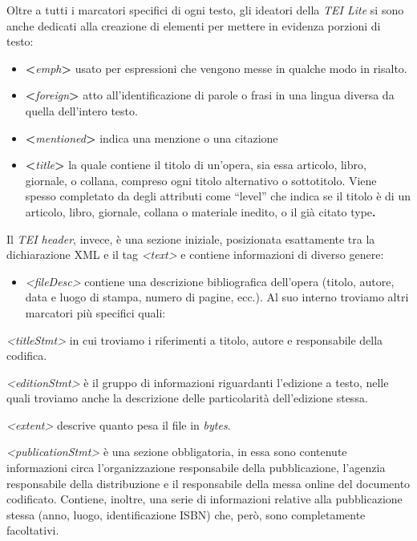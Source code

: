 \documentclass[
  b5paper,
  twoside,
  11pt,
  chapterprefix=false,
  bibliography=totocnumbered,
  parskip=0]{scrbook}
\providecommand{\tightlist}{%
  \setlength{\itemsep}{0pt}\setlength{\parskip}{0pt}}
\begin{document}
Oltre a tutti i marcatori specifici di ogni testo, gli ideatori della
\emph{TEI Lite} si sono anche dedicati alla creazione di elementi per mettere
in evidenza porzioni di testo:

\begin{itemize}
\item
  \textbf{\textless{}}\emph{emph}\textbf{\textgreater{}} usato per espressioni che vengono messe in
  qualche modo in risalto.
\item
  \textbf{\textless{}}\emph{foreign}\textbf{\textgreater{}} atto all'identificazione di parole o frasi in
  una lingua diversa da quella dell'intero testo.
\item
  \textbf{\textless{}}\emph{mentioned}\textbf{\textgreater{}} indica una menzione o una citazione
\item
  \textbf{\textless{}}\emph{title}\textbf{\textgreater{}} la quale contiene il titolo di un'opera, sia
  essa articolo, libro, giornale, o collana, compreso ogni titolo
  alternativo o sottotitolo. Viene spesso completato da degli
  attributi come \enquote{level} che indica se il titolo è di un articolo,
  libro, giornale, collana o materiale inedito, o il già citato
  type\textbf{.}
\end{itemize}

Il \emph{TEI header}, invece, è una sezione iniziale, posizionata esattamente
tra la dichiarazione XML e il tag \emph{\textless text\textgreater{}} e contiene informazioni di
diverso genere:

\begin{itemize}
\tightlist
\item
  \emph{\textless fileDesc\textgreater{}} contiene una descrizione bibliografica dell'opera
  (titolo, autore, data e luogo di stampa, numero di pagine, ecc.). Al
  suo interno troviamo altri marcatori più specifici quali:
\end{itemize}

\emph{\textless titleStmt\textgreater{}} in cui troviamo i riferimenti a titolo, autore e
responsabile della codifica.

\emph{\textless editionStmt\textgreater{}} è il gruppo di informazioni riguardanti l'edizione a
testo, nelle quali troviamo anche la descrizione delle particolarità
dell'edizione stessa.

\emph{\textless extent\textgreater{}} descrive quanto pesa il file in \emph{bytes}.

\emph{\textless publicationStmt\textgreater{}} è una sezione obbligatoria, in essa sono contenute
informazioni circa l'organizzazione responsabile della pubblicazione,
l'agenzia responsabile della distribuzione e il responsabile della messa
online del documento codificato. Contiene, inoltre, una serie di
informazioni relative alla pubblicazione stessa (anno, luogo,
identificazione ISBN) che, però, sono completamente facoltativi.
\end{document}
